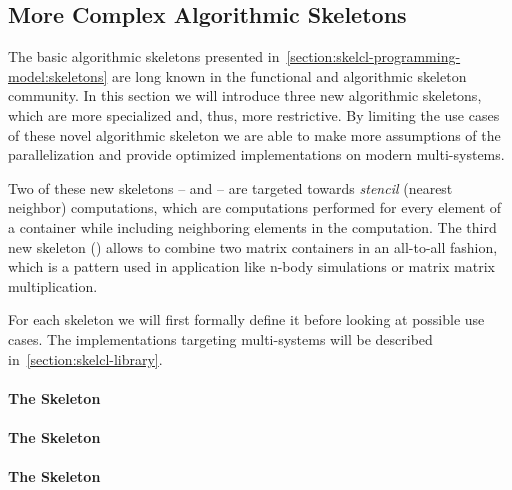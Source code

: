 \subsection{More Complex Algorithmic Skeletons}
\label{section:skelcl-programming-model:specialSkeletons}

The basic algorithmic skeletons presented in~\autoref{section:skelcl-programming-model:skeletons} are long known in the functional and algorithmic skeleton community.
In this section we will introduce three new algorithmic skeletons, which are more specialized and, thus, more restrictive.
By limiting the use cases of these novel algorithmic skeleton we are able to make more assumptions of the parallelization and provide optimized implementations on modern multi-\GPU systems.

Two of these new skeletons -- \mapOverlap and \stencil -- are targeted towards \emph{stencil} (\aka nearest neighbor) computations, which are computations performed for every element of a container while including neighboring elements in the computation.
The third new skeleton (\allpairs) allows to combine two matrix containers in an all-to-all fashion, which is a pattern used in application like n-body simulations or matrix matrix multiplication.

For each skeleton we will first formally define it before looking at possible use cases.
The implementations targeting multi-\GPU systems will be described in~\autoref{section:skelcl-library}.


\paragraph{The \mapOverlap Skeleton}


\paragraph{The \stencil Skeleton}


\paragraph{The \allpairs Skeleton}













































